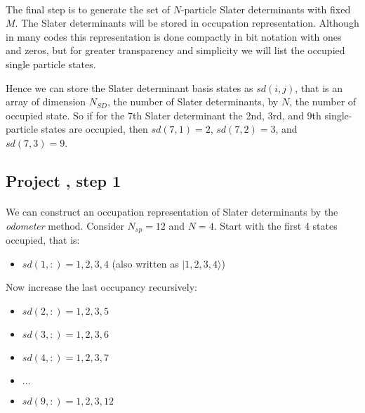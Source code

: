 \documentclass[%
twoside,                 %
final,                   %
10pt]{article}
\begin{document}
\paragraph{}
The final step is to generate the set of $N$-particle Slater determinants with fixed $M$. 
The Slater determinants will be stored in occupation representation.  Although in many codes
this representation is done compactly in bit notation with ones and zeros, but for 
greater transparency and simplicity we will list the occupied single particle states.

 Hence we can 
store the Slater determinant basis states as $sd(i,j)$, that is an 
array of dimension $N_{SD}$, the number of Slater determinants, by $N$, the number of occupied 
state. So if for the 7th Slater determinant the 2nd, 3rd, and 9th single-particle states are occupied, 
then $sd(7,1) = 2$, $sd(7,2) = 3$, and $sd(7,3) = 9$.



\subsection{Project , step 1}

\paragraph{}

We can construct an occupation representation of Slater determinants by the \emph{odometer}
method.  Consider $N_{sp} = 12$ and $N=4$. 
Start with the first 4 states occupied, that is:

\begin{itemize}
\item $sd(1,:)= 1,2,3,4$ (also written as $|1,2,3,4 \rangle$)
\end{itemize}

\noindent
Now increase the last occupancy recursively:
\begin{itemize}
\item $sd(2,:)= 1,2,3,5$

\item $sd(3,:)= 1,2,3,6$

\item $sd(4,:)= 1,2,3,7$

\item $\ldots$

\item $sd(9,:)= 1,2,3,12$
\end{itemize}
\end{document}
